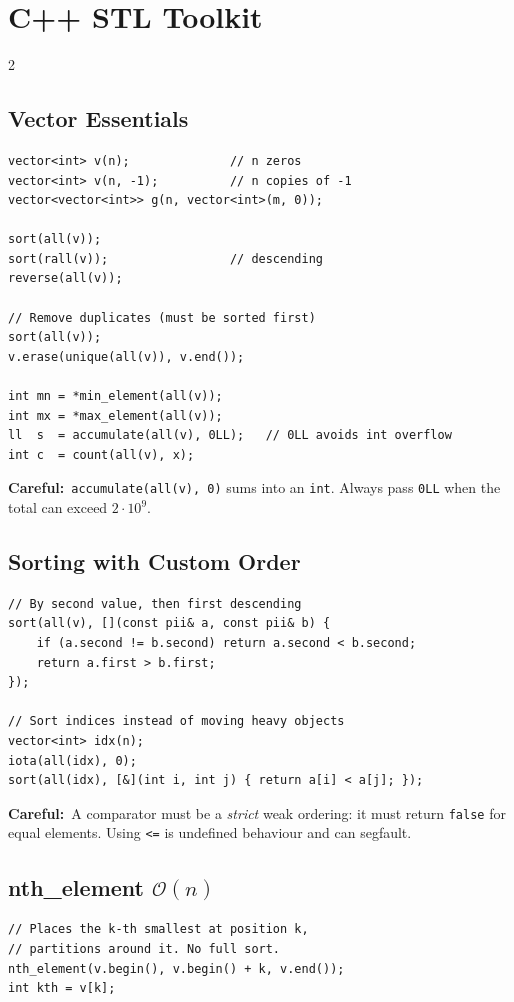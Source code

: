 \documentclass[10pt]{article}
\newcommand{\code}[1]{\texttt{\small #1}}
\newcommand{\sub}[2]{\subsection[#1]{#1\hspace{0.6em}%
  \textnormal{\color{accent2}\small$\mathcal{O}(#2)$}}}
\newcommand{\warn}[1]{{\color{warnc}\footnotesize\textbf{Careful:}}~{\footnotesize #1}\par}
\begin{document}
\section{C++ STL Toolkit}
\begin{multicols}{2}

\subsection{Vector Essentials}
\begin{lstlisting}
vector<int> v(n);              // n zeros
vector<int> v(n, -1);          // n copies of -1
vector<vector<int>> g(n, vector<int>(m, 0));

sort(all(v));
sort(rall(v));                 // descending
reverse(all(v));

// Remove duplicates (must be sorted first)
sort(all(v));
v.erase(unique(all(v)), v.end());

int mn = *min_element(all(v));
int mx = *max_element(all(v));
ll  s  = accumulate(all(v), 0LL);   // 0LL avoids int overflow
int c  = count(all(v), x);
\end{lstlisting}
\warn{\code{accumulate(all(v), 0)} sums into an \code{int}. Always pass
\code{0LL} when the total can exceed $2\cdot 10^9$.}

\subsection{Sorting with Custom Order}
\begin{lstlisting}
// By second value, then first descending
sort(all(v), [](const pii& a, const pii& b) {
    if (a.second != b.second) return a.second < b.second;
    return a.first > b.first;
});

// Sort indices instead of moving heavy objects
vector<int> idx(n);
iota(all(idx), 0);
sort(all(idx), [&](int i, int j) { return a[i] < a[j]; });
\end{lstlisting}
\warn{A comparator must be a \emph{strict} weak ordering: it must return
\code{false} for equal elements. Using \code{<=} is undefined behaviour
and can segfault.}

\sub{nth\_element}{n}
\begin{lstlisting}
// Places the k-th smallest at position k,
// partitions around it. No full sort.
nth_element(v.begin(), v.begin() + k, v.end());
int kth = v[k];
\end{lstlisting}


\end{multicols}
\end{document}
